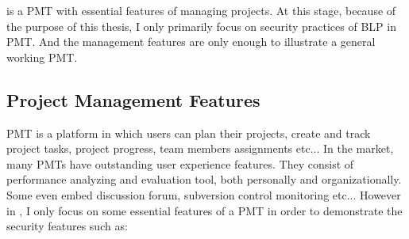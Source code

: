 \myProject is a PMT with essential features of managing projects.
At this stage, because of the purpose of this thesis, I only primarily focus on security practices of BLP in PMT.
And the management features are only enough to illustrate a general working PMT.


\subsection{Project Management Features}
\label{ch:hopot_project:concepts:pm_features} 

PMT is a platform in which users can plan their projects, create and track project tasks, project progress, team members assignments etc...
In the market, many PMTs have outstanding user experience features.
They consist of performance analyzing and evaluation tool, both personally and organizationally.
Some even embed discussion forum, subversion control monitoring etc...
However in \myProject, I only focus on some essential features of a PMT in order to demonstrate the security features such as:

